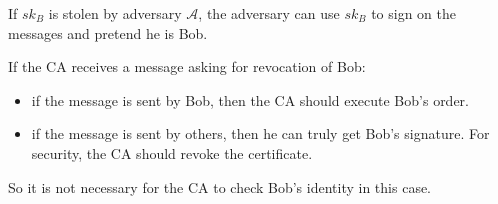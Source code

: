 \documentclass[a4paper]{article}
\newcommand{\A}{\mathcal{A}}
\newenvironment{problem}[2][Problem]{\begin{trivlist}
\item[\hskip \labelsep {\bfseries #1}\hskip \labelsep {\bfseries #2.}]}{\end{trivlist}}
\begin{document}
\begin{problem}{12.14}
If $sk_B$ is stolen by adversary $\A$, the adversary can use $sk_B$ to sign on the messages and pretend he is Bob. \par
If the CA receives a message asking for revocation of Bob: \begin{itemize}
    \item if the message is sent by Bob, then the CA should execute Bob's order.
    \item if the message is sent by others, then he can truly get Bob's signature. For security, the CA should revoke the certificate.
\end{itemize}
So it is not necessary for the CA to check Bob’s identity in this case.
\end{problem}
\end{document}
